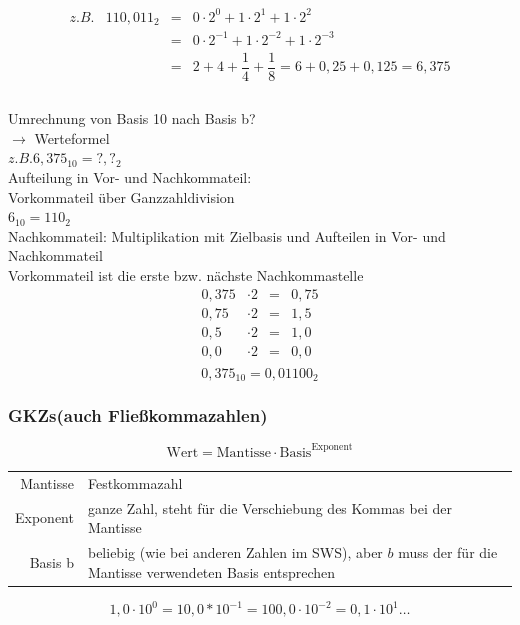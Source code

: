 \documentclass[10pt,a4paper]{scrartcl}
\begin{document}
$$
\begin{array}{rrcl}
z.B. & 110,011_2 & = & 0 \cdot 2^0 + 1 \cdot 2^1 + 1 \cdot 2^2 \\
        &                     & = & 0 \cdot 2^{-1} + 1 \cdot 2^{-2} + 1 \cdot 2^{-3} \\
        &                     & = & 2 + 4 + \dfrac{1}{4} + \dfrac{1}{8} = 6 + 0,25 + 0,125 = 6,375 \\
\end{array}
$$
\\
Umrechnung von Basis 10 nach Basis b? \\
$\rightarrow$ Werteformel\\
$ z.B. 6,375_{10} = ?,?_2 $\\
\noindent
Aufteilung in Vor- und Nachkommateil: \\
Vorkommateil über Ganzzahldivision\\
$ 6_{10} = 110_{2} $\\
Nachkommateil: Multiplikation mit Zielbasis und Aufteilen in Vor- und Nachkommateil \\
Vorkommateil ist die erste bzw. nächste Nachkommastelle
$$
\begin{array}{rlcl}
0,375 & \cdot 2 & = & 0,75\\
0,75   & \cdot 2 & = & 1,5\\
0,5     & \cdot 2 & = & 1,0\\
0,0     & \cdot 2 & = & 0,0\\
\end{array}
$$
$$
0,375_{10} = 0,01100_{2}
$$

\subsubsection{\acp{GKZ}(auch Fließkommazahlen)}
$$
\text{Wert} = \text{Mantisse} \cdot \text{Basis}^{\text{Exponent}}
$$
\begin{tabular}{rl}
	Mantisse  & Festkommazahl \\
	Exponent & ganze Zahl, steht für die Verschiebung des Kommas bei der Mantisse\\
	Basis b     & beliebig (wie bei anderen Zahlen im \ac{SWS}), aber $b$ muss der für die Mantisse verwendeten Basis entsprechen\\
\end{tabular}

$$
1,0 \cdot 10^0 = 10,0 * 10^{-1} = 100,0 \cdot 10^{-2} = 0,1 \cdot 10^{1} \ldots
$$

\end{document}
